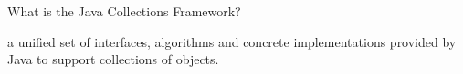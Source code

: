 What is the Java Collections Framework? \\
\begin{answer}
    a unified set of interfaces, algorithms and concrete implementations
provided by Java to support collections of objects.
\end{answer}


\vspace{24pt}